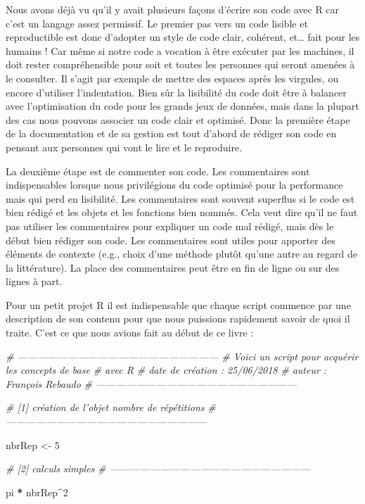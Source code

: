 \documentclass[]{book}
\newenvironment{Shaded}{\begin{snugshade}}{\end{snugshade}}
\newcommand{\DecValTok}[1]{\textcolor[rgb]{0.00,0.00,0.81}{#1}}
\newcommand{\StringTok}[1]{\textcolor[rgb]{0.31,0.60,0.02}{#1}}
\newcommand{\CommentTok}[1]{\textcolor[rgb]{0.56,0.35,0.01}{\textit{#1}}}
\newcommand{\OperatorTok}[1]{\textcolor[rgb]{0.81,0.36,0.00}{\textbf{#1}}}
\newcommand{\NormalTok}[1]{#1}
\theoremstyle{definition}
\theoremstyle{definition}
\theoremstyle{definition}
\theoremstyle{remark}
\begin{document}
Nous avons déjà vu qu'il y avait plusieurs façons d'écrire son code avec
R car c'est un langage assez permissif. Le premier pas vers un code
lisible et reproductible est donc d'adopter un style de code clair,
cohérent, et\ldots{} fait pour les humains ! Car même si notre code a
vocation à être exécuter par les machines, il doit rester compréhensible
pour soit et toutes les personnes qui seront amenées à le consulter. Il
s'agit par exemple de mettre des espaces après les virgules, ou encore
d'utiliser l'indentation. Bien sûr la lisibilité du code doit être à
balancer avec l'optimisation du code pour les grands jeux de données,
mais dans la plupart des cas nous pouvons associer un code clair et
optimisé. Donc la première étape de la documentation et de sa gestion
est tout d'abord de rédiger son code en pensant aux personnes qui vont
le lire et le reproduire.

La deuxième étape est de commenter son code. Les commentaires sont
indispensables lorsque nous privilégions du code optimisé pour la
performance mais qui perd en lisibilité. Les commentaires sont souvent
superflus si le code est bien rédigé et les objets et les fonctions bien
nommés. Cela veut dire qu'il ne faut pas utiliser les commentaires pour
expliquer un code mal rédigé, mais dès le début bien rédiger son code.
Les commentaires sont utiles pour apporter des éléments de contexte
(e.g., choix d'une méthode plutôt qu'une autre au regard de la
littérature). La place des commentaires peut être en fin de ligne ou sur
des lignes à part.

Pour un petit projet R il est indispensable que chaque script commence
par une description de son contenu pour que nous puissions rapidement
savoir de quoi il traite. C'est ce que nous avions fait au début de ce
livre :

\begin{Shaded}
\begin{Highlighting}[]
\CommentTok{# ------------------------------------------------------------}
\CommentTok{# Voici un script pour acquérir les concepts de base }
\CommentTok{# avec R}
\CommentTok{# date de création : 25/06/2018}
\CommentTok{# auteur : François Rebaudo}
\CommentTok{# ------------------------------------------------------------}

\CommentTok{# [1] création de l'objet nombre de répétitions}
\CommentTok{# ------------------------------------------------------------}

\NormalTok{nbrRep <-}\StringTok{ }\DecValTok{5}

\CommentTok{# [2] calculs simples}
\CommentTok{# ------------------------------------------------------------}

\NormalTok{pi }\OperatorTok{*}\StringTok{ }\NormalTok{nbrRep}\OperatorTok{^}\DecValTok{2}
\end{Highlighting}
\end{Shaded}
\end{document}
